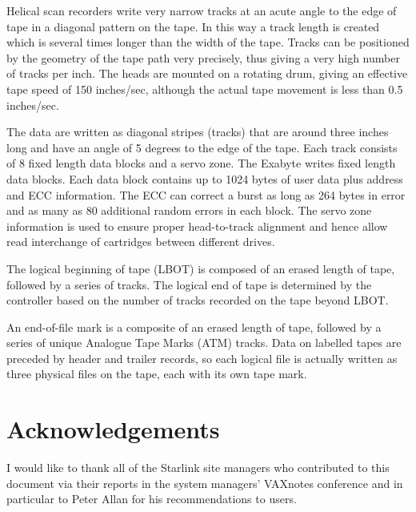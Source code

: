 Helical scan recorders write very narrow tracks at an acute angle to the edge
of tape in a diagonal pattern on the tape. In this way a track length is
created which is several times longer than the width of the tape.  Tracks can
be positioned by the geometry of the tape path  very precisely, thus
giving a very high number of tracks per inch.  The heads are mounted on a
rotating drum, giving an effective tape speed of 150 inches/sec, although the
actual tape movement is less than 0.5 inches/sec.

The data are written as diagonal stripes (tracks) that are around  three inches
long and have an angle of 5 degrees to the edge of the tape. Each track
consists of 8 fixed length data blocks and a servo zone.
The Exabyte writes fixed length data blocks.
Each data block
contains up to 1024 bytes of user data plus address and ECC information.
The ECC can correct a burst as long as 264 bytes in error and as many as 80
additional random errors in each block. The servo zone information is used
to ensure proper head-to-track alignment and hence allow read interchange of
cartridges between different drives.

The logical beginning of tape (LBOT) is composed of an erased length of tape,
followed by a series of tracks. The logical end of tape is determined by the
controller based on the number of tracks recorded on the tape beyond LBOT.

An end-of-file mark is a composite of an erased length of tape, followed by a
series of unique Analogue Tape Marks (ATM) tracks.
Data on labelled tapes are preceded by header and trailer
records, so each logical file is actually written as three physical files on
the tape, each with its own tape mark.

\section{Acknowledgements}

I would like to thank all of the Starlink site managers who contributed
to this document via their reports in the system managers' VAXnotes
conference and in particular to Peter Allan for his recommendations
to users.



